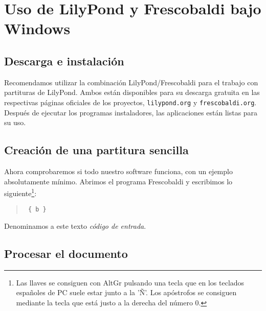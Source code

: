 
\section{Uso de LilyPond y Frescobaldi bajo Windows}
\subsection{Descarga e instalación}

Recomendamos utilizar la combinación LilyPond/Frescobaldi para el
trabajo con partituras de LilyPond. Ambos están disponibles para su
descarga gratuita en las respectivas páginas oficiales de los
proyectos, \texttt{lilypond.org} y \texttt{frescobaldi.org}.  Después
de ejecutar los programas instaladores, las aplicaciones están listas
para su uso.



\subsection{Creación de una partitura sencilla}

Ahora comprobaremos si todo nuestro software funciona, con un ejemplo
absolutamente mínimo. Abrimos el programa Frescobaldi y escribimos lo
siguiente\footnote{Las llaves se consiguen con AltGr pulsando una
  tecla que en los teclados españoles de PC suele estar junto a la
  'Ñ'. Los apóstrofos se consiguen mediante la tecla que está justo a
  la derecha del número 0.}:

\begin{quote}
\begin{verbatim}
 { b }
\end{verbatim}
\end{quote}

Denominamos a este texto \emph{código de entrada}.

\subsection{Procesar el documento}

